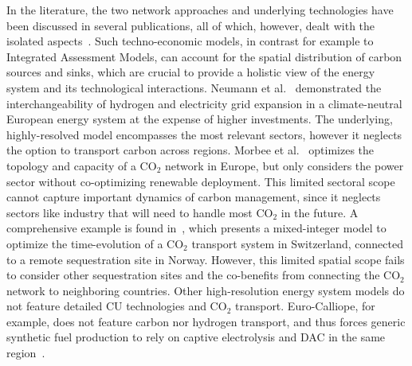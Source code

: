 \documentclass[twocolumn]{article}
\newcommand{\carbon}{CO$_2$}
\begin{document}
In the literature, the two network approaches and underlying technologies have been discussed in several publications, all of which, however, dealt with the isolated aspects~\cite{bakkenLinearModelsOptimization2008,morbeeOptimisedDeploymentEuropean2012,stewartFeasibilityEuropeanwideIntegrated2014,oeiModelingCarbonCapture2014,elahiMultiperiodLeastCost2014,burandtDecarbonizingChinaEnergy2019,middletonSimCCSOpensourceTool2020,bjerketvedtOptimalDesignCost2020,weiProposedGlobalLayout2021,damoreOptimalDesignEuropean2021,becattiniCarbonDioxideCapture2022,neumannBenefitsHydrogenNetwork2022}. Such techno-economic models, in contrast for example to Integrated Assessment Models, can account for the spatial distribution of carbon sources and sinks, which are crucial to provide a holistic view of the energy system and its technological interactions. Neumann et al.~\cite{neumannBenefitsHydrogenNetwork2022} demonstrated the interchangeability of hydrogen and electricity grid expansion in a climate-neutral European energy system at the expense of higher investments. The underlying, highly-resolved model encompasses the most relevant sectors, however it neglects the option to transport carbon across regions.
Morbee et al.~\cite{morbeeOptimisedDeploymentEuropean2012} optimizes the topology and capacity of a \carbon{} network in Europe, but only considers the power sector without co-optimizing renewable deployment. This limited sectoral scope cannot capture important dynamics of carbon management, since it neglects sectors like industry that will need to handle most \carbon{} in the future.
A comprehensive example is found in~\cite{becattiniCarbonDioxideCapture2022}, which presents a mixed-integer model to optimize the time-evolution of a \carbon{} transport system in Switzerland, connected to a remote sequestration site in Norway. However, this limited spatial scope fails to consider other sequestration sites and the co-benefits from connecting the \carbon{} network to neighboring countries.
Other high-resolution energy system models do not feature detailed CU technologies and \carbon{} transport. Euro-Calliope, for example, does not feature carbon nor hydrogen transport, and thus forces generic synthetic fuel production to rely on captive electrolysis and DAC in the same region~\cite{pickeringDiversityOptionsEliminate2022}.
\end{document}
